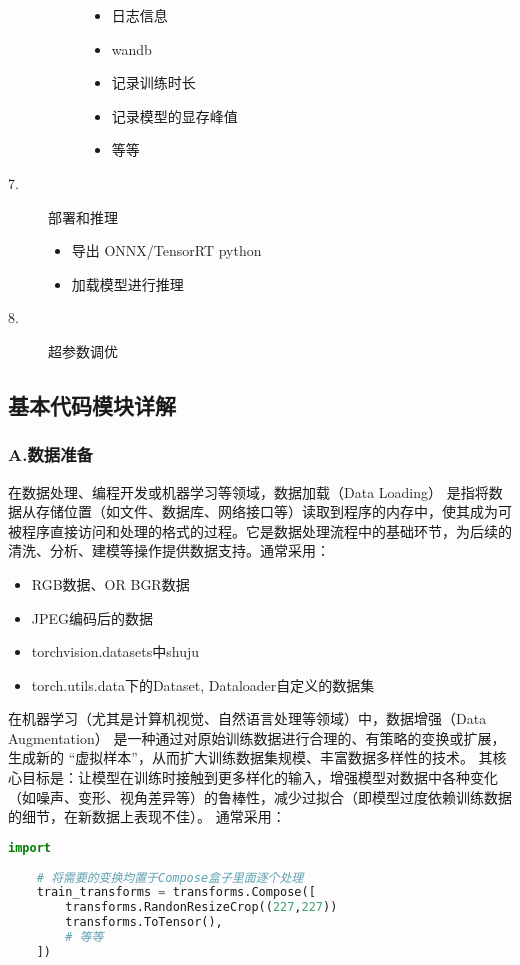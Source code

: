 \begin{description}
\begin{description}
\begin{itemize}
			\item 日志信息
			\item wandb
			\item 记录训练时长
			\item 记录模型的显存峰值
			\item 等等
		\end{itemize}
	\end{description}
	\item[7.] 部署和推理
	\begin{itemize}
		\item 导出 ONNX/TensorRT python
		\item 加载模型进行推理
	\end{itemize}
	\item[8.] 超参数调优
\end{description}

\subsection{基本代码模块详解}

\subsubsection{A.数据准备}
在数据处理、编程开发或机器学习等领域，数据加载（Data Loading） 是指将数据从存储位置（如文件、数据库、网络接口等）读取到程序的内存中，使其成为可被程序直接访问和处理的格式的过程。它是数据处理流程中的基础环节，为后续的清洗、分析、建模等操作提供数据支持。通常采用：
\begin{itemize}
	\item RGB数据、OR BGR数据
	\item JPEG编码后的数据
	\item torchvision.datasets中shuju 
	\item torch.utils.data下的Dataset, Dataloader自定义的数据集
\end{itemize}

在机器学习（尤其是计算机视觉、自然语言处理等领域）中，数据增强（Data Augmentation） 是一种通过对原始训练数据进行合理的、有策略的变换或扩展，生成新的 “虚拟样本”，从而扩大训练数据集规模、丰富数据多样性的技术。
其核心目标是：让模型在训练时接触到更多样化的输入，增强模型对数据中各种变化（如噪声、变形、视角差异等）的鲁棒性，减少过拟合（即模型过度依赖训练数据的细节，在新数据上表现不佳）。
通常采用：

\begin{lstlisting}[language=python,caption={数据增强格式},label=code:Data Augmentation]
	import 
	
	# 将需要的变换均置于Compose盒子里面逐个处理
	train_transforms = transforms.Compose([
		transforms.RandonResizeCrop((227,227))
		transforms.ToTensor(),
		# 等等
	])
\end{lstlisting}

